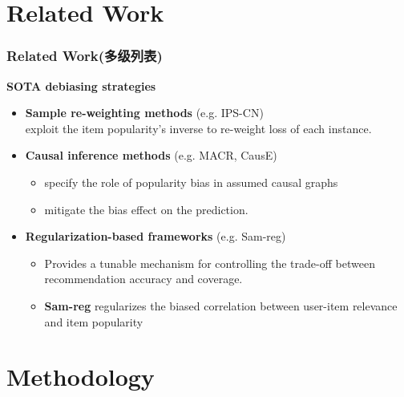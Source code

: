 \documentclass[aspectratio=169]{beamer}%
\begin{document}
{%
\section{Related Work}  
    \begin{frame}
        \frametitle{Related Work(多级列表)}
        \textbf{SOTA debiasing strategies}
        \begin{itemize}
        \item
        \textbf{Sample re-weighting methods} (e.g. IPS-CN)\\
        exploit the item popularity's inverse to re-weight loss of each instance.
        \item
        \textbf{Causal inference methods} (e.g. MACR, CausE)\\
        \begin{itemize}
        \item
        specify the role of popularity bias in assumed causal
        graphs 
        \item
        mitigate the bias effect on the prediction.
        \end{itemize}
        \item
        {
        \textbf{Regularization-based frameworks} (e.g. Sam-reg) \\
        \begin{itemize}
            \item Provides a tunable mechanism for controlling the trade-off between recommendation accuracy and coverage.\\
            \item
                 \textbf{Sam-reg} regularizes the biased correlation between user-item relevance and item popularity
        \end{itemize}}
        \end{itemize}
    \end{frame}

\section{Methodology}  
}
\end{document}
